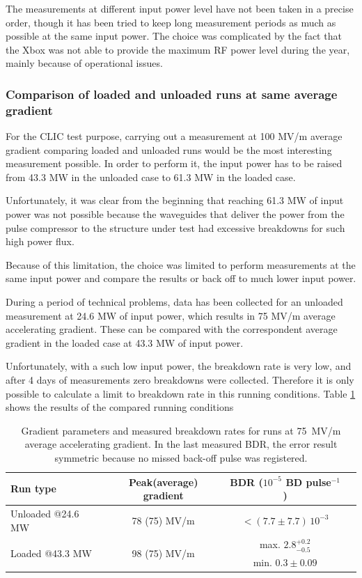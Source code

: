 The measurements at different input power level have not been taken in a precise order, though it has been tried to keep long measurement periods as much as possible at the same input power. 
The choice was complicated by the fact that the Xbox was not able to provide the maximum RF power level during the year, mainly because of operational issues.


\subsubsection{Comparison of loaded and unloaded runs at same average gradient}

For the CLIC test purpose,  carrying out a measurement at 100 MV/m average gradient comparing loaded and unloaded runs would be the most interesting measurement possible. In order to perform it, the input power has to be raised from 43.3 MW in the unloaded case to 61.3 MW in the loaded case.

Unfortunately, it was clear from the beginning that reaching 61.3 MW of input power was not possible because the waveguides that deliver the power from the pulse compressor to the structure under test had excessive breakdowns for such high power flux.

Because of this limitation, the choice was limited to perform measurements at the same input power and compare the results or back off to much lower input power. 

During a period of technical problems, data has been collected for an unloaded measurement at 24.6 MW of input power, which results in 75 MV/m average accelerating gradient. These can be compared with the correspondent average gradient in the loaded case at 43.3 MW of input power. 

Unfortunately, with a such low input power, the breakdown rate is very low, and after 4 days of measurements zero breakdowns were collected. Therefore it is only possible to calculate a limit to breakdown rate in this running conditions. Table \ref{comp_avg75} shows the results of the compared running conditions


\begin{table}[h]
  \centering
    \begin{tabular}{ l c c c }
    \hline
    \hline
    Run type							&		Peak(average) gradient  		& BDR ($10^{-5}$ BD pulse$^{-1}$)	\\
    \hline
    Unloaded	@24.6 MW 				&		78 (75) MV/m				&	$< (7.7 \pm 7.7) \, 10^{-3} $ 			\\
    \multirow{ 2}{*}{Loaded  @43.3 MW} 		&		\multirow{ 2}{*}{98 (75) MV/m} 	& 	max. $2.8^{+0.2} _{-0.5}$    		\\
    									&								&	min. $0.3\pm0.09$	\\
    \hline
    \hline
    \end{tabular}
\caption{Gradient parameters and measured breakdown rates for runs at 75~MV/m average accelerating gradient. In the last measured BDR, the error result symmetric because no missed back-off pulse was registered. }
\label{comp_avg75}
\end{table}

